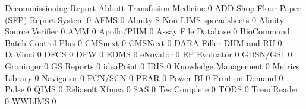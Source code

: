 \documentclass{article}
\begin{document}
\begin{Schunk}
\begin{Soutput}
                                           Decommissioning Report
  Abbott Transfusion Medicine                                   0
  ADD Shop Floor Paper (SFP) Report System                      0
  AFMS                                                          0
  Alinity S Non-LIMS spreadsheets                               0
  Alinity Source Verifier                                       0
  AMM                                                           0
  Apollo/PHM                                                    0
  Assay File Database                                           0
  BioCommand Batch Control Plus                                 0
  CMSnext                                                       0
  CMSNext                                                       0
  DARA Filler DHM and RU                                        0
  DaVinci                                                       0
  DFCS                                                          0
  DPW                                                           0
  EDMS                                                          0
  eNovator                                                      0
  EP Evaluator                                                  0
  GDSN/GS1                                                      0
  Groninger                                                     0
  GS Reports                                                    0
  ideaPoint                                                     0
  IRIS                                                          0
  Knowledge Management                                          0
  Metrics Library                                               0
  Navigator                                                     0
  PCN/SCN                                                       0
  PEAR                                                          0
  Power BI                                                      0
  Print on Demand                                               0
  Pulse                                                         0
  QIMS                                                          0
  Reliasoft Xfmea                                               0
  SAS                                                           0
  TestComplete                                                  0
  TODS                                                          0
  TrendReader                                                   0
  WWLIMS                                                        0


\end{Soutput}
\end{Schunk}
\end{document}
